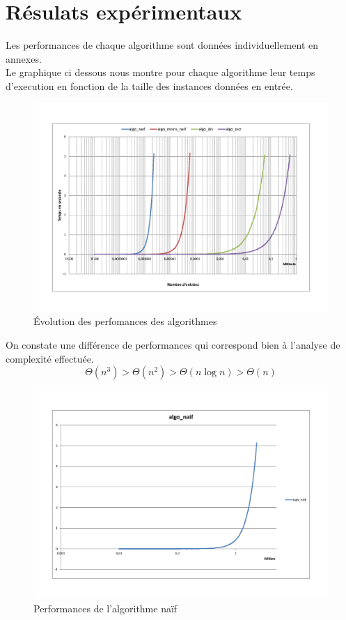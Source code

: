 \documentclass[11pt, a4paper]{article}
\begin{document}
\section{Résulats expérimentaux}

Les performances de chaque algorithme sont données individuellement en
annexes. \\

Le graphique ci dessous nous montre pour chaque algorithme leur temps
d'execution en fonction de la taille des instances données en entrée.

\begin{figure}[h]
\includegraphics [scale=0.5]{images/comparatif.png}
\caption{Évolution des perfomances des algorithmes}
\end{figure}

On constate une différence de performances qui correspond bien à l'analyse de
complexité effectuée.
\[ \Theta{(n^3)} > \Theta{(n^2)} > \Theta{(n \log n)} > \Theta{(n)} \]

\appendix

\begin{figure}[h]
\includegraphics [scale=0.5]{images/algo_naif.png}
\caption{Performances de l'algorithme naïf}
\end{figure}
\end{document}
